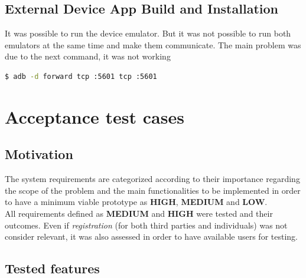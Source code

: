 \documentclass[a4paper, hidelinks, 12pt]{report}
\begin{document}
\begin{itemize}
\begin{enumerate}
	\section{External Device App Build and Installation}
	It was possible to run the device emulator. But it was not possible to run both emulators at the same time and make them communicate. The main problem was due to the next command, it was not working
	
		\begin{lstlisting}[language=bash]
			$ adb -d forward tcp :5601 tcp :5601
		\end{lstlisting}
	
		\end{enumerate}
	\end{itemize}

	\chapter{Acceptance test cases}
	
	\section{Motivation}
	The system requirements are categorized according to their importance regarding the scope of the problem and the main functionalities to be implemented in order to have a minimum viable prototype as \textbf{HIGH}, \textbf{MEDIUM} and \textbf{LOW}. \\

	All requirements defined as \textbf{MEDIUM} and \textbf{HIGH} were tested and their outcomes. Even if \textit{registration} (for both third parties and individuals) was not consider relevant, it was also assessed in order to have available users for testing.

	\section{Tested features}
\end{document}
